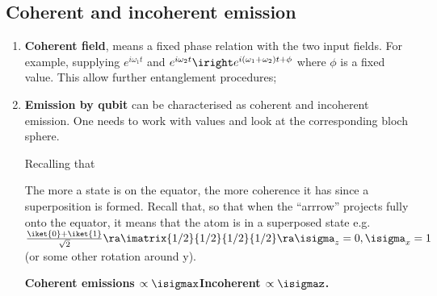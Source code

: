       \subsection{Coherent and incoherent emission}
      \begin{enumerate}
      \item \textbf{Coherent  field}, means a  fixed phase relation with  the two
        input   fields.    For   example,    supplying   $   e^{i\omega_1t}    $   and
        $  e^{i\omega_2t}  \iright  e^{i(\omega_1+\omega_2)t +  \phi}$  where  $  \phi  $ is  a  fixed
        value. This allow further entanglement procedures;
      \item  \textbf{Emission by  qubit}  can be  characterised  as coherent  and
        incoherent emission.  One needs  to work  with   values and
        look at the corresponding bloch sphere.
 	
 	\begin{figure}[h]
 	\end{figure}
 	
 	Recalling that
 	
 	
 	\noindent The more a  state is on the equator, the  more coherence it has
        since a superposition is formed. Recall that, so that when the ``arrrow''
        projects  fully  onto  the equator,  it  means  that  the  atom is  in  a
        superposed                           state                           e.g.
        $ \frac{\iket{0}+\iket{1}}{\sqrt{2}} \ra \imatrix{1/2}{1/2}{1/2}{1/2} \ra
        \isigma_z = 0, \isigma_x = 1$ (or some other rotation around y).
 	
 	\begin{center}
          \textbf{Coherent     emissions     $    \propto     \isigmax$\newline     Incoherent
            $ \propto\isigmaz $. \large}
 	\end{center}
 	

\end{enumerate}
